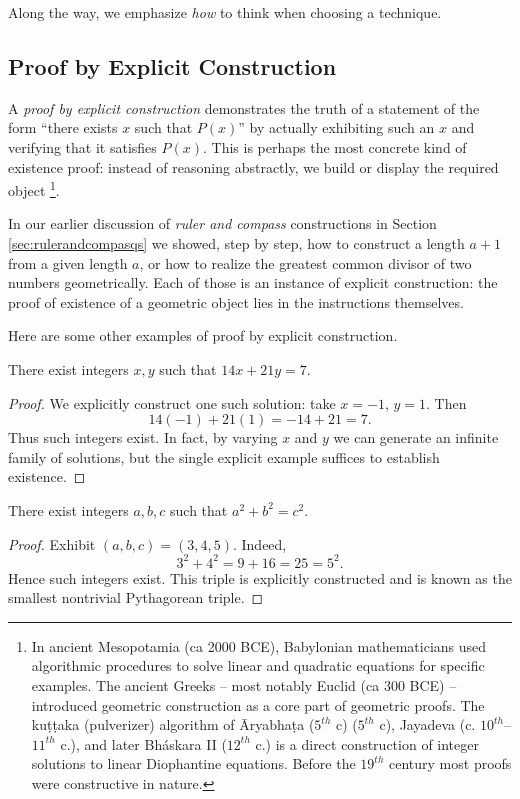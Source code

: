 Along the way, we emphasize \emph{how} to think when choosing a technique.

\subsection{Proof by Explicit Construction}

A \emph{proof by explicit construction} demonstrates the truth of a statement of
the form ``there exists $x$ such that $P(x)$'' by actually exhibiting such an
$x$ and verifying that it satisfies $P(x)$. This is perhaps the most concrete
kind of existence proof: instead of reasoning abstractly, we build or display
the required object \footnote{In ancient Mesopotamia (ca 2000 BCE), Babylonian mathematicians used algorithmic procedures to solve linear and quadratic equations for specific examples. The ancient Greeks -- most notably Euclid (ca 300 BCE) --  introduced geometric construction as a core part of geometric proofs. The ku\d{t}\d{t}aka (pulverizer) algorithm of \={A}ryabha\d{t}a ($5^{th}$ c) ($5^{th}$ c), Jayadeva (c. $10^{th}$–$11^{th}$ c.), and later Bh\'{a}skara II ($12^{th}$ c.) is a direct construction of integer solutions to linear Diophantine equations. Before the $19^{th}$ century most proofs were constructive in nature.}.

In our earlier discussion of \emph{ruler and compass} constructions in Section \ref{sec:rulerandcompasqs} we showed,
step by step, how to construct a length $a+1$ from a given length $a$, or how
to realize the greatest common divisor of two numbers geometrically. Each of
those is an instance of explicit construction: the proof of existence of a
geometric object lies in the instructions themselves.

Here are some other examples of proof by explicit construction. 

\begin{theorem}
There exist integers $x,y$ such that $14x+21y=7$.
\end{theorem}
\begin{proof}
We explicitly construct one such solution: take $x=-1$, $y=1$. Then
\[
14(-1)+21(1)=-14+21=7.
\]
Thus such integers exist. In fact, by varying $x$ and $y$ we can generate an
infinite family of solutions, but the single explicit example suffices to
establish existence.
\end{proof}

\begin{theorem}
There exist integers $a,b,c$ such that $a^2+b^2=c^2$.
\end{theorem}
\begin{proof}
Exhibit $(a,b,c)=(3,4,5)$. Indeed,
\[
3^2+4^2=9+16=25=5^2.
\]
Hence such integers exist. This triple is explicitly constructed and is known
as the smallest nontrivial Pythagorean triple.
\end{proof}

